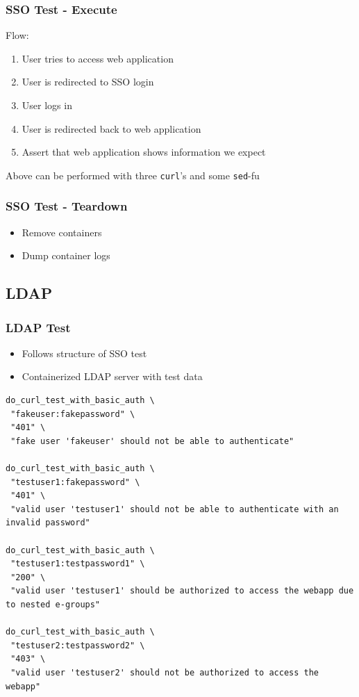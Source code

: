 \documentclass[14pt,aspectratio=169]{beamer}
\begin{document}
\begin{frame}
  \frametitle{SSO Test - Execute}
  Flow:
  \begin{enumerate}
    \item User tries to access web application
    \item User is redirected to SSO login
    \item User logs in
    \item User is redirected back to web application
    \item Assert that web application shows information we expect
  \end{enumerate}
  \hfill\break %
  Above can be performed with three \texttt{curl}'s and some \texttt{sed}-fu
\end{frame}

\begin{frame}
  \frametitle{SSO Test - Teardown}
  \begin{itemize}
    \item Remove containers
    \item Dump container logs
  \end{itemize}
\end{frame}

\subsection{LDAP}

\begin{frame}[fragile]
  \frametitle{LDAP Test}
  \begin{itemize}
    \item Follows structure of SSO test
    \item Containerized LDAP server with test data
  \end{itemize}
  \begin{verbatim}
do_curl_test_with_basic_auth \
 "fakeuser:fakepassword" \
 "401" \
 "fake user 'fakeuser' should not be able to authenticate"

do_curl_test_with_basic_auth \
 "testuser1:fakepassword" \
 "401" \
 "valid user 'testuser1' should not be able to authenticate with an invalid password"

do_curl_test_with_basic_auth \
 "testuser1:testpassword1" \
 "200" \
 "valid user 'testuser1' should be authorized to access the webapp due to nested e-groups"

do_curl_test_with_basic_auth \
 "testuser2:testpassword2" \
 "403" \
 "valid user 'testuser2' should not be authorized to access the webapp"
  \end{verbatim}
\end{frame}
\end{document}
